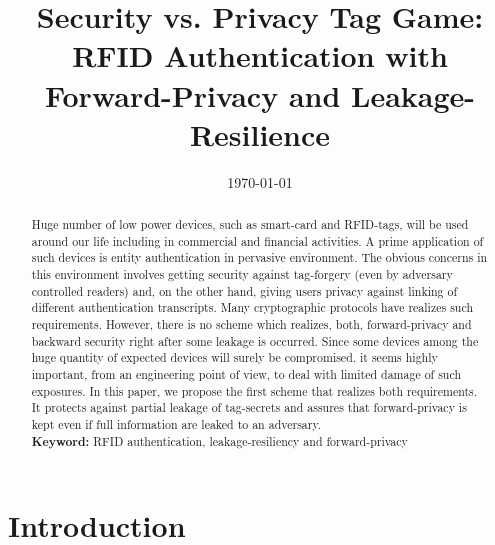 \documentclass[english]{llncs}
\begin{document}
\title{Security vs. Privacy Tag Game:\\
RFID Authentication with Forward-Privacy and Leakage-Resilience}

\maketitle
\date{\today} 
\begin{abstract}
Huge number of low power devices, such as smart-card and RFID-tags,
will be used around our life including in commercial and financial
activities. A prime application of such devices is entity
authentication in pervasive environment.  The obvious concerns in this
environment involves getting security against tag-forgery (even by
adversary controlled readers) and, on the other hand, giving users
privacy against linking of different authentication transcripts.
%
%
  Many cryptographic protocols have realizes such
  requirements. However, there is no scheme which realizes, both,
  forward-privacy and backward security right after some leakage is
  occurred. Since some devices among the huge quantity of expected
  devices will surely be compromised.  it seems highly important, from
  an engineering point of view, to deal with limited damage of such
  exposures.
%
 In this paper, we propose the first scheme that realizes both
 requirements. It protects against partial leakage of tag-secrets and
 assures that forward-privacy is kept even if full information are
 leaked to an adversary.  
\\ {\bf Keyword: } RFID authentication, leakage-resiliency and
 forward-privacy
\end{abstract}

\section{Introduction}
\end{document}
